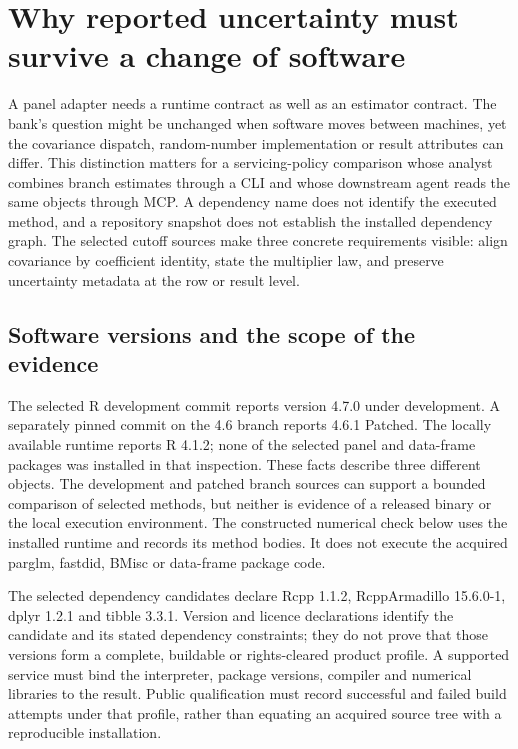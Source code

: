 \section{Why reported uncertainty must survive a change of software}
\label{sec:exec29-panel-runtime-semantics}

A panel adapter needs a runtime contract as well as an estimator contract. The bank's question might be unchanged when software moves between machines, yet the covariance dispatch, random-number implementation or result attributes can differ. This distinction matters for a servicing-policy comparison whose analyst combines branch estimates through a CLI and whose downstream agent reads the same objects through MCP. A dependency name does not identify the executed method, and a repository snapshot does not establish the installed dependency graph. The selected cutoff sources make three concrete requirements visible: align covariance by coefficient identity, state the multiplier law, and preserve uncertainty metadata at the row or result level.~\citep{exec29_panel_runtime_sources}

\subsection{Software versions and the scope of the evidence}

The selected R development commit reports version 4.7.0 under development. A separately pinned commit on the 4.6 branch reports 4.6.1 Patched. The locally available runtime reports R 4.1.2; none of the selected panel and data-frame packages was installed in that inspection. These facts describe three different objects. The development and patched branch sources can support a bounded comparison of selected methods, but neither is evidence of a released binary or the local execution environment. The constructed numerical check below uses the installed runtime and records its method bodies. It does not execute the acquired parglm, fastdid, BMisc or data-frame package code.~\citep{exec29_panel_runtime_sources,exec29_panel_runtime_reference}

The selected dependency candidates declare Rcpp 1.1.2, RcppArmadillo 15.6.0-1, dplyr 1.2.1 and tibble 3.3.1. Version and licence declarations identify the candidate and its stated dependency constraints; they do not prove that those versions form a complete, buildable or rights-cleared product profile. A supported service must bind the interpreter, package versions, compiler and numerical libraries to the result. Public qualification must record successful and failed build attempts under that profile, rather than equating an acquired source tree with a reproducible installation.~\citep{exec29_panel_runtime_sources}

